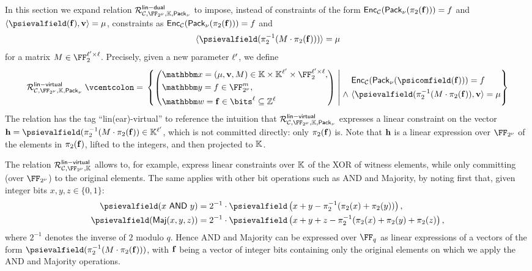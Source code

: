 \documentclass[11pt,letterpaper,usenames,dvipsnames]{article}
\begin{document}
In this section we expand relation $\Relation^{\mathsf{lin-dual}}_{\cC, \comfield, \evalfield, \pack}$ to impose, instead of constraints of the form $\mathsf{Enc}_{\mathcal{C}}(\mathsf{Pack}_\nu(\pi_2(\mathbf{f})))=f$ and $\langle \psievalfield(\bff), \vv  \rangle = \mu$, constraints as $\mathsf{Enc}_{\mathcal{C}}(\mathsf{Pack}_\nu(\pi_2(\mathbf{f}))) = f$  and $$\langle \psievalfield(\pi_2^{-1}(M\cdot \pi_2(\bff))) \rangle = \mu$$ for a matrix $M\in \FF_{2}^{\codedim' \times \codedim}$. Precisely, given a new parameter $\ell'$, we define 
%
$$
\Relation^{\mathsf{lin-virtual}}_{\cC, \comfield, \evalfield, \pack} \defeq \left\{ \left(\begin{aligned} &\inp=(\mu, \vv, M)\in \evalfield \times \evalfield^{\codedim'} \times \FF_2^{\codedim' \times \codedim}, \\&\oracle = f \in \comfield^\codelength, \\ &\wit= \bff\in \bits^\codedim \subseteq \ZZ^\codedim\end{aligned}\right) \;\middle|\;  \begin{aligned} &\Enc_{\cC}(\pack(\psicomfield(\bff))) = f\\ \wedge \  & \langle \psievalfield(\pi_2^{-1}(M \cdot \pi_2(\bff)), \vv\rangle  = \mu  \end{aligned} \right\}
$$
%
The relation has the tag ``lin(ear)-virtual'' to reference the intuition that  $\Relation^{\mathsf{lin-virtual}}_{\cC, \comfield, \evalfield, \pack} $ expresses a linear constraint on the vector $\bfh=\psievalfield(\pi_2^{-1}(M \cdot \pi_2(\bff))\in \evalfield^{\codedim'}$, which is not committed directly: only $\pi_2(\mathbf{f})$  is. Note that $\mathbf{h}$ is a linear expression over $\comfield$ of the elements in $\pi_2(\mathbf{f})$, lifted to the integers, and then projected to $\mathbb{K}$.

 The relation $\Relation_{\cC, \comfield, \evalfield}^{\mathsf{lin-virtual}}$  allows to, for example, express linear constraints over $\mathbb{K}$ of the XOR of witness elements, while only committing (over $\comfield$) to the original elements. The same applies with other bit operations such as AND and Majority, by noting first that, given integer bits $x,y,z\in \{0,1\}$:  
%
\begin{equation*}
    \begin{aligned}
        \psievalfield(x \band y) & = 2^{-1}\cdot \psievalfield \left( x+y - \pi_2^{-1}(\pi_2(x) + \pi_2(y)) \right),\\
        \psievalfield(\Maj(x,y,z)) &= 2^{-1}\cdot \psievalfield \left( x+y+z - \pi_2^{-1}(\pi_2(x) + \pi_2(y) + \pi_2(z) \right),
    \end{aligned}
\end{equation*}
where $2^{-1}$ denotes the inverse of $2$ modulo $q$.  
%
Hence AND and Majority can be expressed over $\FF_q$ as  linear expressions of a vectors of the form $\psievalfield(\pi_2^{-1}(M\cdot \pi_2(\bff)))$, with $\mathbf{f}$ being a vector of integer bits containing only the original elements on which we apply the AND and Majority operations. 
\end{document}
